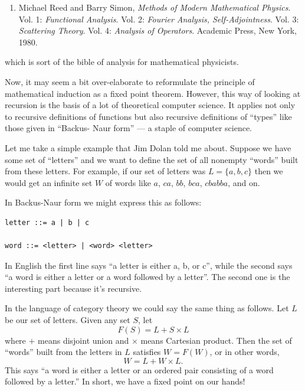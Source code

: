 \documentclass{article}
\def\tightlist{}
\begin{document}
\begin{enumerate}
\def\labelenumi{\arabic{enumi})}
\setcounter{enumi}{1}
\tightlist
\item
  Michael Reed and Barry Simon, \emph{Methods of Modern Mathematical
  Physics}. Vol. 1: \emph{Functional Analysis}. Vol. 2: \emph{Fourier
  Analysis, Self-Adjointness}. Vol. 3: \emph{Scattering Theory}. Vol. 4:
  \emph{Analysis of Operators}. Academic Press, New York, 1980.
\end{enumerate}

which is sort of the bible of analysis for mathematical physicists.

Now, it may seem a bit over-elaborate to reformulate the principle of
mathematical induction as a fixed point theorem. However, this way of
looking at recursion is the basis of a lot of theoretical computer
science. It applies not only to recursive definitions of functions but
also recursive definitions of ``types'' like those given in ``Backus-
Naur form'' --- a staple of computer science.

Let me take a simple example that Jim Dolan told me about. Suppose we
have some set of ``letters'' and we want to define the set of all
nonempty ``words'' built from these letters. For example, if our set of
letters was \(L = \{a,b,c\}\) then we would get an infinite set \(W\) of
words like \(a\), \(ca\), \(bb\), \(bca\), \(cbabba\), and on.

In Backus-Naur form we might express this as follows:

\begin{verbatim}
letter ::= a | b | c

word ::= <letter> | <word> <letter>
\end{verbatim}

In English the first line says ``a letter is either a, b, or c'', while
the second says ``a word is either a letter or a word followed by a
letter''. The second one is the interesting part because it's recursive.

In the language of category theory we could say the same thing as
follows. Let \(L\) be our set of letters. Given any set \(S\), let
\[F(S) = L + S \times L\] where \(+\) means disjoint union and
\(\times\) means Cartesian product. Then the set of ``words'' built from
the letters in \(L\) satisfies \(W = F(W)\), or in other words,
\[W = L + W \times L.\] This says ``a word is either a letter or an
ordered pair consisting of a word followed by a letter.'' In short, we
have a fixed point on our hands!
\end{document}
